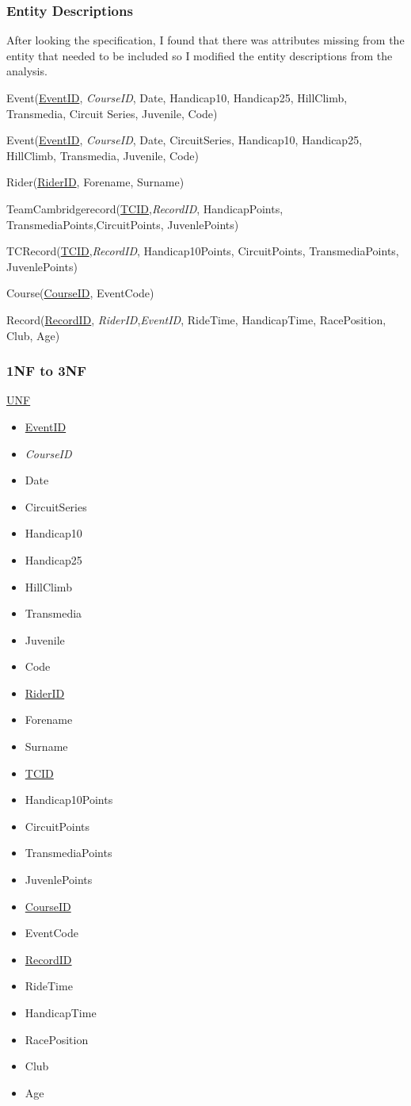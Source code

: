 \subsubsection{Entity Descriptions}
After looking the specification, I found that there was attributes missing from the entity that needed to be included so I modified the entity descriptions from the analysis.


Event(\underline{EventID}, \emph{CourseID}, Date, Handicap10, Handicap25, HillClimb, Transmedia, Circuit Series, Juvenile, Code)

Event(\underline{EventID}, \emph{CourseID}, Date, CircuitSeries, Handicap10, Handicap25, HillClimb, Transmedia, Juvenile, Code)


Rider(\underline{RiderID}, Forename, Surname)


TeamCambridgerecord(\underline{TCID},\emph{RecordID}, HandicapPoints, TransmediaPoints,CircuitPoints, JuvenlePoints)

TCRecord(\underline{TCID},\emph{RecordID}, Handicap10Points, CircuitPoints, TransmediaPoints, JuvenlePoints)

Course(\underline{CourseID}, EventCode)

Record(\underline{RecordID}, \emph{RiderID},\emph{EventID}, RideTime, HandicapTime, RacePosition, Club, Age)

\subsubsection{1NF to 3NF}

\underline{UNF}

\begin{itemize}
\item \underline{EventID}
\item \emph{CourseID}
\item Date
\item CircuitSeries
\item Handicap10
\item Handicap25
\item HillClimb
\item Transmedia
\item Juvenile
\item Code
\item \underline{RiderID}
\item Forename
\item Surname
\item \underline{TCID}
\item Handicap10Points
\item CircuitPoints
\item TransmediaPoints
\item JuvenlePoints
\item \underline{CourseID}
\item EventCode
\item \underline{RecordID}
\item RideTime
\item HandicapTime
\item RacePosition
\item Club
\item Age
\end{itemize}


